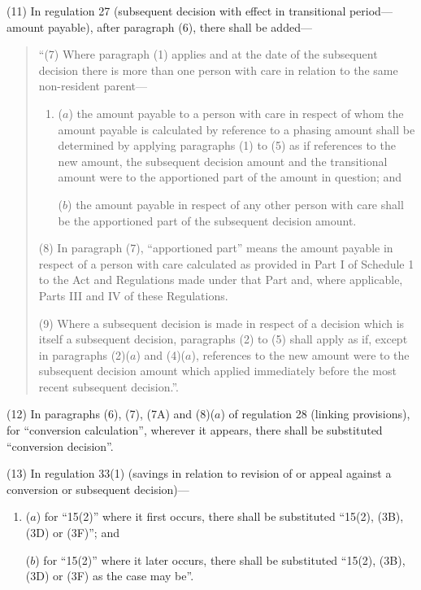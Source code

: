 \documentclass[12pt,a4paper]{article}
\begin{document}
(11) In regulation 27 (subsequent decision with effect in transitional period—amount payable), after paragraph (6), there shall be added—
\begin{quotation}
“(7) Where paragraph (1) applies and at the date of the subsequent decision there is more than one person with care in relation to the same non-resident parent—
\begin{enumerate}\item[]
($a$) the amount payable to a person with care in respect of whom the amount payable is calculated by reference to a phasing amount shall be determined by applying paragraphs (1) to (5) as if references to the new amount, the subsequent decision amount and the transitional amount were to the apportioned part of the amount in question; and

($b$) the amount payable in respect of any other person with care shall be the apportioned part of the subsequent decision amount.
\end{enumerate}

(8) In paragraph (7), “apportioned part” means the amount payable in respect of a person with care calculated as provided in Part I of Schedule 1 to the Act and Regulations made under that Part and, where applicable, Parts III and IV of these Regulations.

(9) Where a subsequent decision is made in respect of a decision which is itself a subsequent decision, paragraphs (2) to (5) shall apply as if, except in paragraphs (2)($a$)  and (4)($a$), references to the new amount were to the subsequent decision amount which applied immediately before the most recent subsequent decision.”.
\end{quotation}

(12) In paragraphs (6), (7), (7A) and (8)($a$)  of regulation 28 (linking provisions), for “conversion calculation”, wherever it appears, there shall be substituted “conversion decision”.

(13) In regulation 33(1) (savings in relation to revision of or appeal against a conversion or subsequent decision)—
\begin{enumerate}\item[]
($a$) for “15(2)” where it first occurs, there shall be substituted “15(2), (3B), (3D) or (3F)”; and

($b$) for “15(2)” where it later occurs, there shall be substituted “15(2), (3B), (3D) or (3F) as the case may be”.
\end{enumerate}
\end{document}
